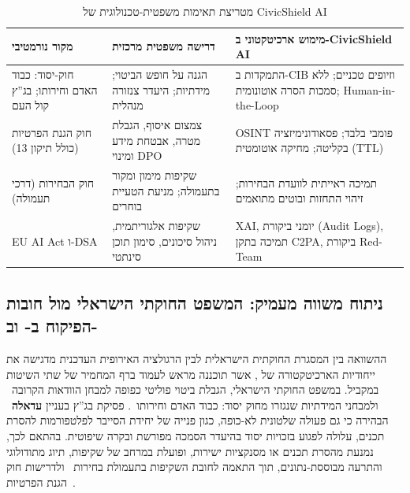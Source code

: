 \begin{table}[htbp]
\centering
\caption{מטריצת תאימות משפטית-טכנולוגית של \textenglish{CivicShield AI}}
\label{tab:legal_matrix}
\begin{tabularx}{\textwidth}{p{3.3cm} X X}
\toprule
\textbf{מקור נורמטיבי} & \textbf{דרישה משפטית מרכזית} & \textbf{מימוש ארכיטקטוני ב-\textenglish{CivicShield AI}} \\
\midrule
חוק-יסוד: כבוד האדם וחירותו; בג''ץ קול העם & הגנה על חופש הביטוי; מידתיות; היעדר צנזורה מנהלית & התמקדות ב-\textenglish{CIB} וזיופים טכניים; ללא סמכות הסרה אוטונומית; \textenglish{Human-in-the-Loop} \\
\addlinespace
חוק הגנת הפרטיות (כולל תיקון 13) & צמצום איסוף, הגבלת מטרה, אבטחת מידע ומינוי \textenglish{DPO} & \textenglish{OSINT} פומבי בלבד; פסאודונימיזציה בקליטה; מחיקה אוטומטית (TTL) \\
\addlinespace
חוק הבחירות (דרכי תעמולה) & שקיפות מימון ומקור בתעמולה; מניעת הטעיית בוחרים & תמיכה ראייתית לוועדת הבחירות; זיהוי התחזות ובוטים מתואמים \\
\addlinespace
\textenglish{EU AI Act} ו-\textenglish{DSA} & שקיפות אלגוריתמית, ניהול סיכונים, סימון תוכן סינתטי & \textenglish{XAI}, יומני ביקורת (\textenglish{Audit Logs}), תמיכה בתקן \textenglish{C2PA}, ביקורת \textenglish{Red-Team} \\
\bottomrule
\end{tabularx}
\end{table}

\subsection{ניתוח משווה מעמיק: המשפט החוקתי הישראלי מול חובות הפיקוח ב- וב-}
\label{sec:deep_comparative_analysis}

ההשוואה בין המסגרת החוקתית הישראלית לבין הרגולציה האירופית העדכנית מדגישה את ייחודיות הארכיטקטורה של , אשר תוכננה מראש לעמוד ברף המחמיר של שתי השיטות במקביל. במשפט החוקתי הישראלי, הגבלת ביטוי פוליטי כפופה למבחן הוודאות הקרובה~\cite{kolhaam1953} ולמבחני המידתיות שנגזרו מחוק יסוד: כבוד האדם וחירותו~\cite{basiclaw1992,barak2012proportionality}. פסיקת בג''ץ בעניין \textbf{עדאלה}~\cite{adalah2021cyber} הבהירה כי גם פעולה שלטונית לא-כופה, כגון פנייה של יחידת הסייבר לפלטפורמות להסרת תכנים, עלולה לפגוע בזכויות יסוד בהיעדר הסמכה מפורשת ובקרה שיפוטית. בהתאם לכך,  נמנעת מהסרת תכנים או מסנקציות ישירות, ופועלת במרחב של שקיפות, תיוג מתודולוגי והתרעה מבוססת-נתונים, תוך התאמה לחובת השקיפות בתעמולת בחירות~\cite{elections_propaganda1959,cec_transparency2019} ולדרישות חוק הגנת הפרטיות~\cite{privacy_law1981}.

